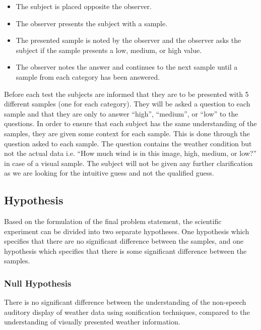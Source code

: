 \begin{itemize}
    \item The subject is placed opposite the observer.
    \item The observer presents the subject with a sample.
    \item The presented sample is noted by the observer and the observer asks the subject if the sample presents a low, medium, or high value.
    \item The observer notes the answer and continues to the next sample until a sample from each category has been answered.
\end{itemize}
Before each test the subjects are informed that they are to be presented with 5 different samples (one for each category). 
They will be asked a question to each sample and that they are only to answer \enquote{high}, \enquote{medium}, or \enquote{low} to the questions. 
In order to ensure that each subject has the same understanding of the samples, they are given some context for each sample. 
This is done through the question asked to each sample. 
The question contains the weather condition but not the actual data i.e. \enquote{How much wind is in this image, high, medium, or low?} in case of a visual sample.
The subject will not be given any further clarification as we are looking for the intuitive guess and not the qualified guess.



\subsection{Hypothesis} %
\label{sub:hypothesis}

Based on the formulation of the final problem statement, the scientific experiment can be divided into two separate hypotheses. 
One hypothesis which specifies that there are no significant difference between the samples, and one hypothesis which specifies that there is some significant difference between the samples.


\subsubsection*{Null Hypothesis} %
\label{ssub:null_hypothesis}

There is no significant difference between the understanding of the non-speech auditory display of weather data using sonification techniques, compared to the understanding of visually presented weather information. 

